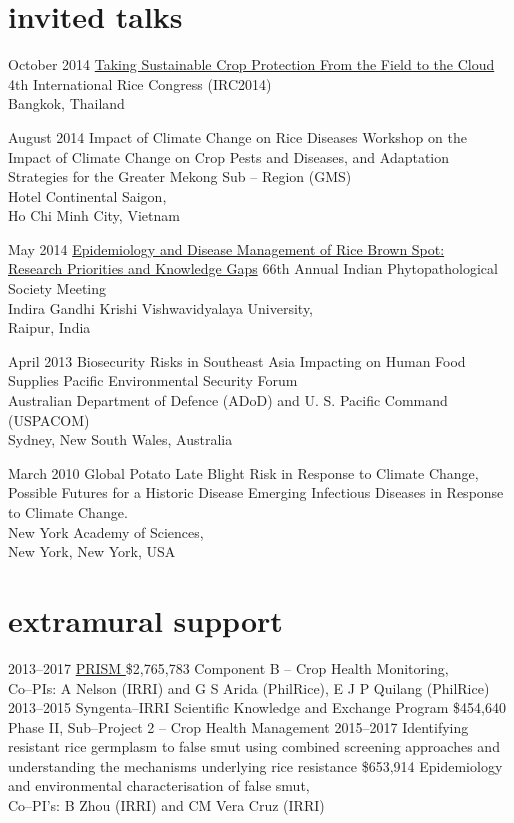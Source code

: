 \documentclass[]{friggeri-cv}
\begin{document}
\section*{invited talks}
\begin{entrylist}
 \entry
	{October 2014}
	{\href{http://figshare.com/articles/Taking_Sustainable_Crop_Protection_From_the_Field_to_the_Cloud/1225800}{Taking Sustainable Crop Protection From the Field to the Cloud}}
	{}
	{4th International Rice Congress (IRC2014)\\Bangkok, Thailand}
	{}
	
\entry
 	{August 2014}
	{Impact of Climate Change on Rice Diseases}
	{}
	{Workshop on the Impact of Climate Change on Crop Pests and Diseases, and Adaptation Strategies for the Greater Mekong Sub -- Region (GMS)\\Hotel Continental Saigon,\\Ho Chi Minh City, Vietnam}
	
 \entry
 	{May 2014}
	{\href{http://figshare.com/articles/IPS_2014/1037569}{Epidemiology and Disease Management of Rice Brown Spot:\\Research Priorities and Knowledge Gaps}}
	{}
	{66th Annual Indian Phytopathological Society Meeting\\Indira Gandhi Krishi Vishwavidyalaya University,\\Raipur, India}
	
 \entry
	{April 2013}
	{Biosecurity Risks in Southeast Asia Impacting on Human Food Supplies}
	{}
	{Pacific Environmental Security Forum\\Australian Department of Defence (ADoD) and U. S. Pacific Command (USPACOM)\\Sydney, New South Wales, Australia}

 \entry
	 {March 2010} 
	{Global Potato Late Blight Risk in Response to Climate Change, Possible Futures for a Historic Disease}
  	{}
  	{Emerging Infectious Diseases in Response to Climate Change.\\New York Academy of Sciences,\\New York, New York, USA}
\end{entrylist}

\section*{extramural support}
  \begin{entrylist}
  \entry
	{2013--2017}
	{\href{http://philippinericeinfo.ph/}{PRISM }}
	{\$2,765,783}
	{Component B -- Crop Health Monitoring,\\Co--PIs: A Nelson (IRRI) and G S Arida (PhilRice), E J P Quilang (PhilRice)}
  \entry
	{2013--2015}
	{Syngenta--IRRI Scientific Knowledge and Exchange Program}
	{\$454,640}
	{Phase II, Sub--Project 2 -- Crop Health Management}
  \entry
    {2015--2017}
    {Identifying resistant rice germplasm to false smut using combined screening approaches and understanding the mechanisms underlying rice resistance}
    {\$653,914}
    {Epidemiology and environmental characterisation of false smut,\\Co--PI's: B Zhou (IRRI) and CM Vera Cruz (IRRI)}
  \end{entrylist}


\end{document}
